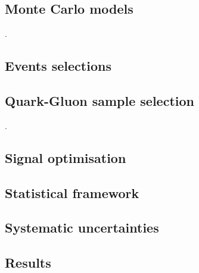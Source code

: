 \subsection{Monte Carlo models}
\label{sec:benchmark_signals}.  %

\clearpage

\subsection{Events selections}
\label{sec:event_selection}

\clearpage


\subsection{Quark-Gluon sample selection}
\label{sec:QGselection}.  %

\clearpage

\subsection{Signal optimisation}
\label{sec:Optimisation} %

\clearpage

\subsection{Statistical framework}

\clearpage


\subsection{Systematic uncertainties}

\clearpage


\subsection{Results}

\clearpage




